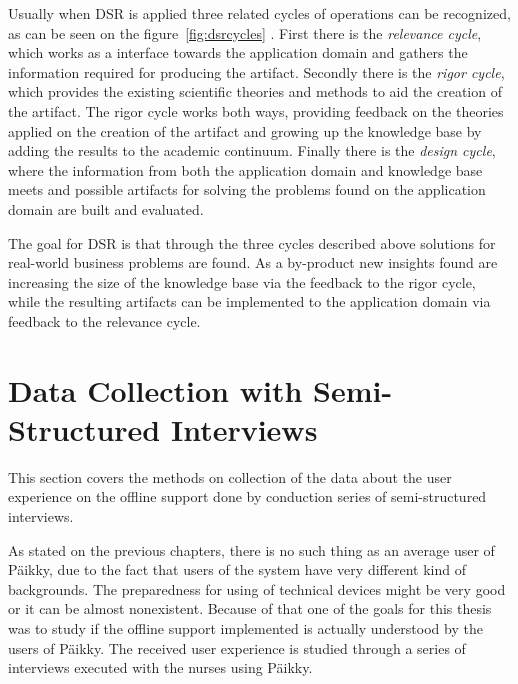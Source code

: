 Usually when DSR is applied three related cycles of operations can be recognized, as can be seen on the figure~\ref{fig:dsrcycles} \cite{hevner_three_2007}. First there is the \textit{relevance cycle}, which works as a interface towards the application domain and gathers the information required for producing the artifact. Secondly there is the \textit{rigor cycle}, which provides the existing scientific theories and methods to aid the creation of the artifact. The rigor cycle works both ways, providing feedback on the theories applied on the creation of the artifact and growing up the knowledge base by adding the results to the academic continuum. Finally there is the \textit{design cycle}, where the information from both the application domain and knowledge base meets and possible artifacts for solving the problems found on the application domain are built and evaluated. 

The goal for DSR is that through the three cycles described above solutions for real-world business problems are found. As a by-product new insights found are increasing the size of the knowledge base via the feedback to the rigor cycle, while the resulting artifacts can be implemented to the application domain via feedback to the relevance cycle. \cite{piirainen_constructive_2013}






\section{Data Collection with Semi-Structured Interviews}

This section covers the methods on collection of the data about the user experience on the offline support done by conduction series of semi-structured interviews.

As stated on the previous chapters, there is no such thing as an average user of Päikky, due to the fact that users of the system have very different kind of backgrounds. The preparedness for using of technical devices might be very good or it can be almost nonexistent. Because of that one of the goals for this thesis was to study if the offline support implemented is actually understood by the users of Päikky. The received user experience is studied through a series of interviews executed with the nurses using Päikky.

